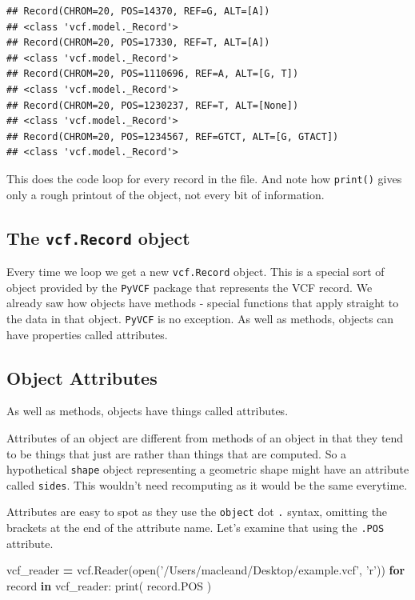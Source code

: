 \documentclass[]{book}
\newenvironment{Shaded}{\begin{snugshade}}{\end{snugshade}}
\newcommand{\BuiltInTok}[1]{#1}
\newcommand{\ControlFlowTok}[1]{\textcolor[rgb]{0.13,0.29,0.53}{\textbf{#1}}}
\newcommand{\KeywordTok}[1]{\textcolor[rgb]{0.13,0.29,0.53}{\textbf{#1}}}
\newcommand{\NormalTok}[1]{#1}
\newcommand{\OperatorTok}[1]{\textcolor[rgb]{0.81,0.36,0.00}{\textbf{#1}}}
\newcommand{\StringTok}[1]{\textcolor[rgb]{0.31,0.60,0.02}{#1}}
\theoremstyle{definition}
\theoremstyle{definition}
\theoremstyle{definition}
\theoremstyle{remark}
\begin{document}
\begin{verbatim}
## Record(CHROM=20, POS=14370, REF=G, ALT=[A])
## <class 'vcf.model._Record'>
## Record(CHROM=20, POS=17330, REF=T, ALT=[A])
## <class 'vcf.model._Record'>
## Record(CHROM=20, POS=1110696, REF=A, ALT=[G, T])
## <class 'vcf.model._Record'>
## Record(CHROM=20, POS=1230237, REF=T, ALT=[None])
## <class 'vcf.model._Record'>
## Record(CHROM=20, POS=1234567, REF=GTCT, ALT=[G, GTACT])
## <class 'vcf.model._Record'>
\end{verbatim}

This does the code loop for every record in the file. And note how
\texttt{print()} gives only a rough printout of the object, not every
bit of information.

\hypertarget{the-vcf.record-object}{%
\subsection{\texorpdfstring{The \texttt{vcf.Record}
object}{The vcf.Record object}}\label{the-vcf.record-object}}

Every time we loop we get a new \texttt{vcf.Record} object. This is a
special sort of object provided by the \texttt{PyVCF} package that
represents the VCF record. We already saw how objects have methods -
special functions that apply straight to the data in that object.
\texttt{PyVCF} is no exception. As well as methods, objects can have
properties called attributes.

\hypertarget{object-attributes}{%
\subsection{Object Attributes}\label{object-attributes}}

As well as methods, objects have things called attributes.

Attributes of an object are different from methods of an object in that
they tend to be things that just are rather than things that are
computed. So a hypothetical \texttt{shape} object representing a
geometric shape might have an attribute called \texttt{sides}. This
wouldn't need recomputing as it would be the same everytime.

Attributes are easy to spot as they use the \texttt{object} dot
\texttt{.} syntax, omitting the brackets at the end of the attribute
name. Let's examine that using the \texttt{.POS} attribute.

\begin{Shaded}
\begin{Highlighting}[]
\NormalTok{vcf_reader }\OperatorTok{=}\NormalTok{ vcf.Reader(}\BuiltInTok{open}\NormalTok{(}\StringTok{'/Users/macleand/Desktop/example.vcf'}\NormalTok{, }\StringTok{'r'}\NormalTok{))}
\ControlFlowTok{for}\NormalTok{ record }\KeywordTok{in}\NormalTok{ vcf_reader:}
  \BuiltInTok{print}\NormalTok{( record.POS )}
\end{Highlighting}
\end{Shaded}
\end{document}
